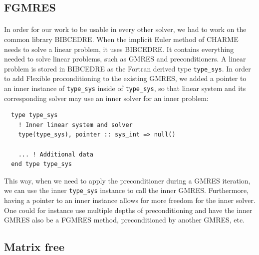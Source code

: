     \subsection{FGMRES}

    \paragraph{}
      In order for our work to be usable in every other solver, we had to work on the common library BIBCEDRE.
      When the implicit Euler method of CHARME needs to solve a linear problem, it uses BIBCEDRE.
      It contains everything needed to solve linear problems, such as GMRES and preconditioners.
      A linear problem is stored in BIBCEDRE as the Fortran derived type \texttt{type_sys}.
      In order to add Flexible proconditioning to the existing GMRES, we added a pointer to an inner instance of \texttt{type_sys} inside of \texttt{type_sys}, so that linear system and its corresponding solver may use an inner solver for an inner problem:
\begin{verbatim}
  type type_sys
    ! Inner linear system and solver
    type(type_sys), pointer :: sys_int => null()

    ... ! Additional data
  end type type_sys
\end{verbatim}
      This way, when we need to apply the preconditioner during a GMRES iteration, we can use the inner \texttt{type_sys} instance to call the inner GMRES.
      Furthermore, having a pointer to an inner instance allows for more freedom for the inner solver.
      One could for instance use multiple depths of preconditioning and have the inner GMRES also be a FGMRES method, preconditioned by another GMRES, etc.


    \subsection{Matrix free}

